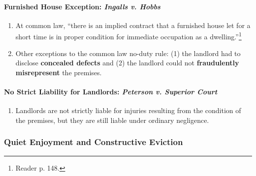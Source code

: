 \paragraph{Furnished House Exception: \emph{Ingalls v. Hobbs}}

\begin{enumerate}
    \item At common law, ``there is an implied contract that a furnished house 
    let for a short time is in proper condition for immediate occupation as a 
    dwelling.''\footnote{Reader p. 148.}
    \item Other exceptions to the common law no-duty rule: (1) the landlord 
    had to disclose \textbf{concealed defects} and (2) the landlord could not 
    \textbf{fraudulently misrepresent} the premises.
\end{enumerate}

\paragraph{No Strict Liability for Landlords: \emph{Peterson v. Superior 
Court}}

\begin{enumerate}
    \item Landlords are not strictly liable for injuries resulting from the 
    condition of the premises, but they are still liable under ordinary 
    negligence.
\end{enumerate}

\subsubsection{Quiet Enjoyment and Constructive Eviction}


